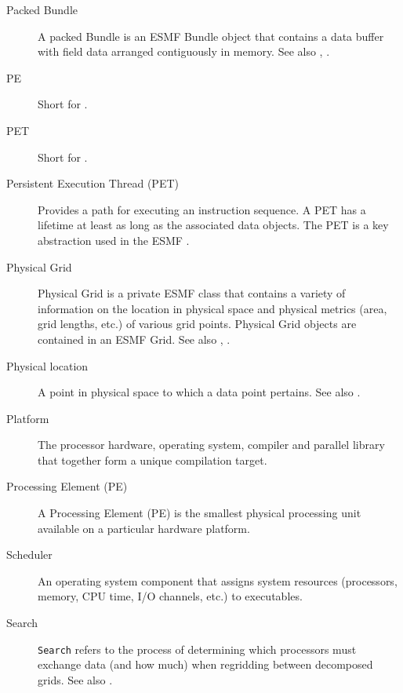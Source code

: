 \begin{description}
\label{glos:PackedBundle} 
\item[Packed Bundle] 
  A packed Bundle is an 
  ESMF Bundle object that contains
  a data buffer with field data arranged contiguously in memory. See 
  also , .

\label{glos:PE} 
\item[PE] 
Short for .

\label{glos:PET} 
\item[PET] 
  Short for .

\label{glos:PermET} 
\item[Persistent Execution Thread (PET)] 
  Provides a
  path for executing an instruction sequence. A PET has a lifetime at least 
  as long as the associated data objects. The PET is a key abstraction 
  used in the ESMF .

\label{glos:PhysGrid} 
\item[Physical Grid] 
  Physical Grid is a private ESMF class that contains a variety of information on the location 
  in physical space and physical metrics (area, grid lengths, etc.) 
  of various grid points.  Physical Grid objects are contained in an 
  ESMF Grid.  See also , 
  .  

\label{glos:PhysLoc} 
\item[Physical location] 
  A point in physical space to which a data point pertains.  See also
  .   

\label{glos:Platform} 
\item[Platform] 
  The processor hardware, operating system, compiler and
  parallel library that together form a unique compilation target.

\label{glos:Processing_Element}
\item[Processing Element (PE)] 
  A Processing Element (PE) is the smallest physical processing unit available
  on a particular hardware platform.

\label{glos:Scheduler} 
\item[Scheduler] 
  An operating system component 
  that assigns system resources (processors, memory, CPU time, 
  I/O channels, etc.) to executables.

\label{glos:Search} 
\item[Search]
  {\tt Search} refers to the process of determining which processors must
  exchange data (and how much) when regridding between decomposed grids.
  See also .


\end{description}
